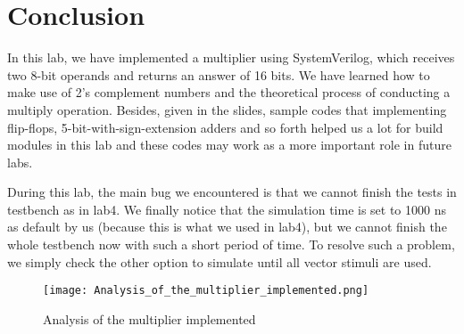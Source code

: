 \documentclass[11pt]{article}
\begin{document}
\section{Conclusion}
In this lab, we have implemented a multiplier using SystemVerilog, which receives two 8-bit operands and returns an answer of 16 bits. We have learned how to make use of 2’s complement numbers and the theoretical process of conducting a multiply operation. Besides, given in the slides, sample codes that implementing flip-flops, 5-bit-with-sign-extension adders and so forth helped us a lot for build modules in this lab and these codes may work as a more important role in future labs.

During this lab, the main bug we encountered is that we cannot finish the tests in testbench as in lab4. We finally notice that the simulation time is set to 1000 ns as default by us (because this is what we used in lab4), but we cannot finish the whole testbench now with such a short period of time. To resolve such a problem, we simply check the other option to simulate until all vector stimuli are used. 


\begin{figure}[h]
    \centering
    \texttt{[image: Analysis\_of\_the\_multiplier\_implemented.png]}
    \caption{Analysis of the multiplier implemented}
    \label{analysis}
\end{figure}
\end{document}
